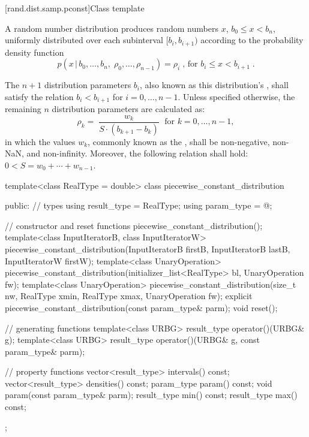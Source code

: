 [rand.dist.samp.pconst]{Class template }%
%
%

\pnum
A  random number distribution
produces random numbers $x$,
$ b_0 \leq x < b_n $,
uniformly distributed over each subinterval
$ [ b_i, b_{i+1} ) $
according to the probability density function
%
%
\[%
 p(x\,|\,b_0,\ldots,b_n,\;\rho_0,\ldots,\rho_{n-1})
      = \rho_i
\; \mbox{,}
\mbox{ for } b_i \le x < b_{i+1}
\; \mbox{.}
\]

\pnum
The $n+1$ distribution parameters $b_i$,
also known as this distribution's %
%
%
, shall satisfy the relation
 $ b_i < b_{i+1} $
for $i = 0, \ldots, n\!-\!1 $.
Unless specified otherwise,
the remaining $n$ distribution parameters are calculated as:
\[%
 \rho_k = \;
   \frac{w_k}{S \cdot (b_{k+1}-b_k)}
   \; \mbox{ for } k = 0, \ldots, n\!-\!1,
\]
in which the values $w_k$,
commonly known as the %
%
%
, shall be non-negative, non-NaN, and non-infinity.
Moreover, the following relation shall hold:
 $ 0 < S = w_0 + \cdots + w_{n-1} $.

%
\begin{codeblock}
template<class RealType = double>
  class piecewise_constant_distribution {
  public:
    // types
    using result_type = RealType;
    using param_type  = @\unspec@;

    // constructor and reset functions
    piecewise_constant_distribution();
    template<class InputIteratorB, class InputIteratorW>
      piecewise_constant_distribution(InputIteratorB firstB, InputIteratorB lastB,
                                      InputIteratorW firstW);
    template<class UnaryOperation>
      piecewise_constant_distribution(initializer_list<RealType> bl, UnaryOperation fw);
    template<class UnaryOperation>
      piecewise_constant_distribution(size_t nw, RealType xmin, RealType xmax,
                                      UnaryOperation fw);
    explicit piecewise_constant_distribution(const param_type& parm);
    void reset();

    // generating functions
    template<class URBG>
      result_type operator()(URBG& g);
    template<class URBG>
      result_type operator()(URBG& g, const param_type& parm);

    // property functions
    vector<result_type> intervals() const;
    vector<result_type> densities() const;
    param_type param() const;
    void param(const param_type& parm);
    result_type min() const;
    result_type max() const;
  };
\end{codeblock}



